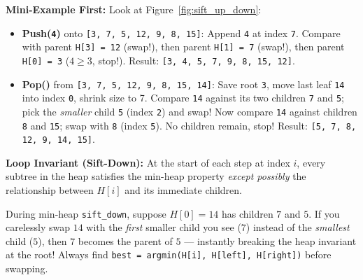 \documentclass[11pt,a4paper]{article}
\theoremstyle{definition}
\newcommand{\examplebeat}{\textbf{\color{primaryblue}Mini-Example First:} }
\newcommand{\invariantbeat}[1]{\par\noindent\textbf{\color{accentteal}Loop Invariant (#1):} }
\begin{document}
\examplebeat Look at Figure~\ref{fig:sift_up_down}:
\begin{itemize}
    \item \textbf{Push(\texttt{4})} onto \texttt{[3, 7, 5, 12, 9, 8, 15]}: Append \texttt{4} at index \texttt{7}. Compare with parent \texttt{H[3] = 12} (swap!), then parent \texttt{H[1] = 7} (swap!), then parent \texttt{H[0] = 3} ($4 \ge 3$, stop!). Result: \texttt{[3, 4, 5, 7, 9, 8, 15, 12]}.
    \item \textbf{Pop()} from \texttt{[3, 7, 5, 12, 9, 8, 15, 14]}: Save root \texttt{3}, move last leaf \texttt{14} into index \texttt{0}, shrink size to 7. Compare \texttt{14} against its two children \texttt{7} and \texttt{5}; pick the \emph{smaller} child \texttt{5} (index \texttt{2}) and swap! Now compare \texttt{14} against children \texttt{8} and \texttt{15}; swap with \texttt{8} (index \texttt{5}). No children remain, stop! Result: \texttt{[5, 7, 8, 12, 9, 14, 15]}.
\end{itemize}

\invariantbeat{Sift-Down} At the start of each step at index $i$, every subtree in the heap satisfies the min-heap property \emph{except possibly} the relationship between $H[i]$ and its immediate children.

\begin{watchoutbox}
During min-heap \texttt{sift\_down}, suppose $H[0] = 14$ has children $7$ and $5$. If you carelessly swap $14$ with the \emph{first} smaller child you see ($7$) instead of the \emph{smallest} child ($5$), then $7$ becomes the parent of $5$ --- instantly breaking the heap invariant at the root! Always find \texttt{best = argmin(H[i], H[left], H[right])} before swapping.
\end{watchoutbox}
\end{document}
